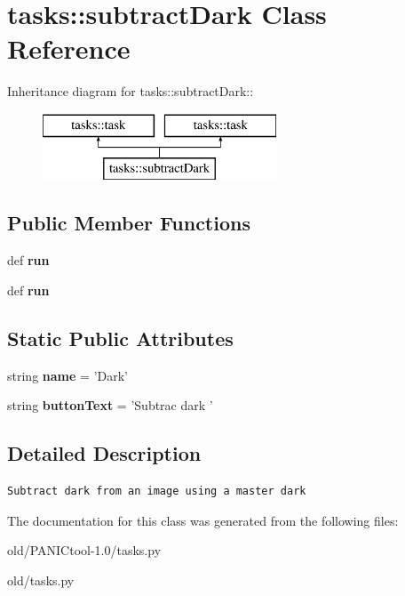 \section{tasks::subtract\-Dark Class Reference}
\label{classtasks_1_1subtractDark}
Inheritance diagram for tasks::subtract\-Dark::\begin{figure}[H]
\begin{center}
\leavevmode
\includegraphics[height=2cm]{classtasks_1_1subtractDark}
\end{center}
\end{figure}
\subsection*{Public Member Functions}
\begin{CompactItemize}
\item 
def \textbf{run}\label{classtasks_1_1subtractDark_ee00c9be02dbec33b836e9e598ae215f}

\item 
def \textbf{run}\label{classtasks_1_1subtractDark_ee00c9be02dbec33b836e9e598ae215f}

\end{CompactItemize}
\subsection*{Static Public Attributes}
\begin{CompactItemize}
\item 
string \textbf{name} = '{\bfsubtract\-Dark}'\label{classtasks_1_1subtractDark_7f8d364c1eb69c54a85896fdf5371ff5}

\item 
string \textbf{button\-Text} = 'Subtrac dark '\label{classtasks_1_1subtractDark_dc63151f70d115268d7b0fdf43fa018f}

\end{CompactItemize}


\subsection{Detailed Description}


\footnotesize\begin{verbatim}Subtract dark from an image using a master dark
\end{verbatim}
\normalsize
 



The documentation for this class was generated from the following files:\begin{CompactItemize}
\item 
old/PANICtool-1.0/tasks.py\item 
old/tasks.py\end{CompactItemize}
